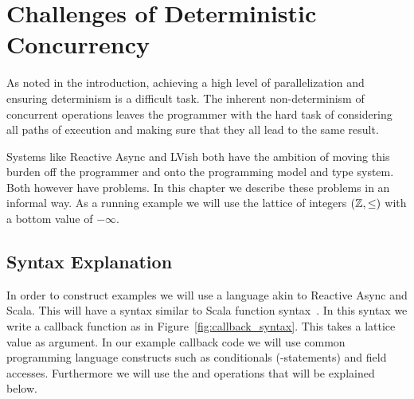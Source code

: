 \chapter{Challenges of Deterministic Concurrency}
\label{cha:challenges}





As noted in the introduction, achieving a high level of parallelization and
ensuring determinism is a difficult task. The inherent non-determinism of
concurrent operations leaves the programmer with the hard task of considering
all paths of execution and making sure that they all lead to the same result.

Systems like Reactive Async and LVish both have the ambition of moving this
burden off the programmer and onto the programming model and type system. Both
however have problems. In this chapter we describe these problems in an informal
way. As a running example we will use the lattice of integers $(\mathbb{Z},
\leq)$ with a bottom value of $-\infty$.


\section{Syntax Explanation}%
\label{sec:operations}

In order to construct examples we will use a language akin to Reactive Async and
Scala. This will have a syntax similar to Scala function
syntax~\parencite{scalabasics}. In this syntax we write a callback function as in
Figure~\ref{fig:callback_syntax}. This takes a lattice value  as
argument. In our example callback code we will use common programming language
constructs such as conditionals (-statements) and field accesses.
Furthermore we will use the  and  operations that will be
explained below.

